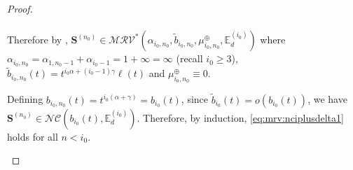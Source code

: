 \documentclass[aos]{imsart}
\numberwithin{equation}{section}
\theoremstyle{plain} %
\theoremstyle{remark}
\newcommand{\E}{\mathbb{E}}
\newcommand{\R}{\mathbb{R}}
\def\MRV{\mathcal{MRV}}
\def\bS{\boldsymbol{S}}
\def\bz{\boldsymbol z}
\begin{document}
\begin{proof}
\begin{enumerate}[(1)]
\begin{align*}
\end{align*}
Therefore by , $\bS^{(n_0)}\in\MRV^*(\alpha_{i_0,n_0},\widetilde{b}_{i_0,n_0},\mu_{i_0,n_0}^{\oplus},\E_d^{(i_0)})$ where $\alpha_{i_0,n_0}=\alpha_{1,n_0-1}+\alpha_{i_0-1}=1+\infty=\infty$ (recall $i_0\ge 3$), $\widetilde{b}_{i_0,n_0}(t)=t^{i_0\alpha+(i_0-1)\gamma}\ell(t)$ and $\mu_{i_0,n_0}^{\oplus}\equiv 0$. 

Defining ${b}_{i_0,n_0}(t) = t^{i_0(\alpha+\gamma)}=b_{i_0}(t)$, since  $\widetilde{b}_{i_0}(t)=o(b_{i_0}(t))$, we have $\bS^{(n_0)}\in\mathcal{NC}({b}_{i_0}(t),\E_d^{(i_0)})$. 
Therefore, by induction, \eqref{eq:mrv:nciplusdelta1} holds for all $n<i_0$.


\end{enumerate}
\end{proof}
\end{document}
